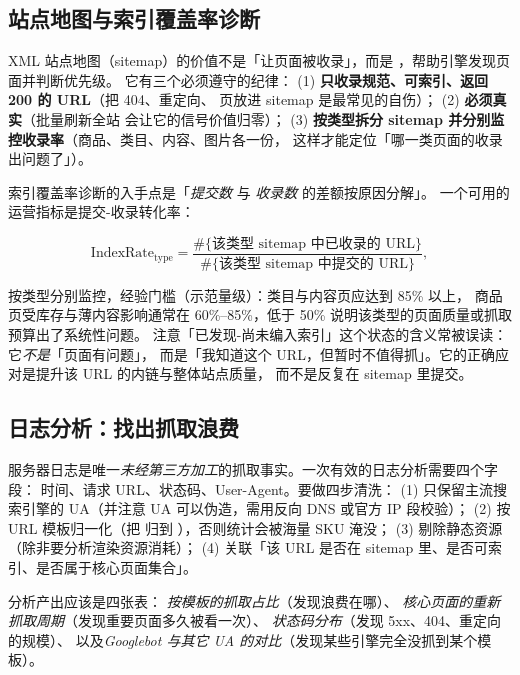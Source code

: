 \subsection{站点地图与索引覆盖率诊断}

XML 站点地图（sitemap）的价值不是「让页面被收录」，而是
，帮助引擎发现页面并判断优先级。
它有三个必须遵守的纪律：
(1) \textbf{只收录规范、可索引、返回 200 的 URL}（把 404、重定向、 页放进 sitemap 是最常见的自伤）；
(2) \textbf{ 必须真实}（批量刷新全站  会让它的信号价值归零）；
(3) \textbf{按类型拆分 sitemap 并分别监控收录率}（商品、类目、内容、图片各一份，
这样才能定位「哪一类页面的收录出问题了」）。

索引覆盖率诊断的入手点是「\emph{提交数} 与 \emph{收录数} 的差额按原因分解」。
一个可用的运营指标是提交-收录转化率：

\begin{equation}
\text{IndexRate}_{\text{type}} = \frac{\#\{\text{该类型 sitemap 中已收录的 URL}\}}{\#\{\text{该类型 sitemap 中提交的 URL}\}} ,
\label{eq:sitemaprate}
\end{equation}

按类型分别监控，经验门槛（示范量级）：类目与内容页应达到 85\% 以上，
商品页受库存与薄内容影响通常在 60\%--85\%，低于 50\% 说明该类型的页面质量或抓取预算出了系统性问题。
注意「已发现-尚未编入索引」这个状态的含义常被误读：它\emph{不是}「页面有问题」，
而是「我知道这个 URL，但暂时不值得抓」。它的正确应对是提升该 URL 的内链与整体站点质量，
而不是反复在 sitemap 里提交。

\subsection{日志分析：找出抓取浪费}

服务器日志是唯一\emph{未经第三方加工}的抓取事实。一次有效的日志分析需要四个字段：
时间、请求 URL、状态码、User-Agent。要做四步清洗：
(1) 只保留主流搜索引擎的 UA（并注意 UA 可以伪造，需用反向 DNS 或官方 IP 段校验）；
(2) 按 URL 模板归一化（把  归到 ），否则统计会被海量 SKU 淹没；
(3) 剔除静态资源（除非要分析渲染资源消耗）；
(4) 关联「该 URL 是否在 sitemap 里、是否可索引、是否属于核心页面集合」。

分析产出应该是四张表：
\emph{按模板的抓取占比}（发现浪费在哪）、
\emph{核心页面的重新抓取周期}（发现重要页面多久被看一次）、
\emph{状态码分布}（发现 5xx、404、重定向的规模）、
以及\emph{Googlebot 与其它 UA 的对比}（发现某些引擎完全没抓到某个模板）。

